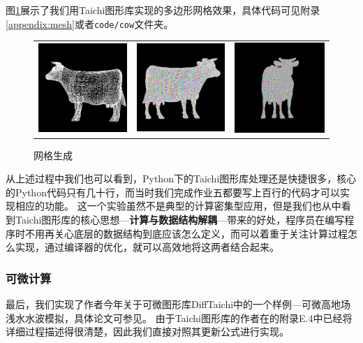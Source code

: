 \documentclass[thesis]{thesis}
\begin{document}
图\ref{fig:mesh}展示了我们用Taichi图形库实现的多边形网格效果，具体代码可见附录\ref{appendix:mesh}或者\verb'code/cow'文件夹。
\begin{figure}[!ht]
\centering
\begin{tabular}{ccc}
\includegraphics[width=0.33\linewidth]{fig/cow1.png}&
\includegraphics[width=0.33\linewidth]{fig/cow2.png}&
\includegraphics[width=0.33\linewidth]{fig/cow3.png}
\end{tabular}
\caption{网格生成\protect\footnotemark}
\label{fig:mesh}
\end{figure}

从上述过程中我们也可以看到，Python下的Taichi图形库处理还是快捷很多，核心的Python代码只有几十行，而当时我们完成作业五都要写上百行的代码才可以实现相应的功能。
这一个实验虽然不是典型的计算密集型应用，但是我们也从中看到Taichi图形库的核心思想---\textbf{计算与数据结构解耦}---带来的好处，程序员在编写程序时不用再关心底层的数据结构到底应该怎么定义，而可以着重于关注计算过程怎么实现，通过编译器的优化，就可以高效地将这两者结合起来。

\subsubsection{可微计算}
最后，我们实现了作者今年关于可微图形库DiffTaichi\cite{hu_difftaichi_2019}中的一个样例---可微高地场浅水水波模拟，具体论文可参见\cite{wang:wave_2018}。
由于Taichi图形库的作者在\cite{hu_difftaichi_2019}的附录E.4中已经将详细过程描述得很清楚，因此我们直接对照其更新公式进行实现。
\end{document}
